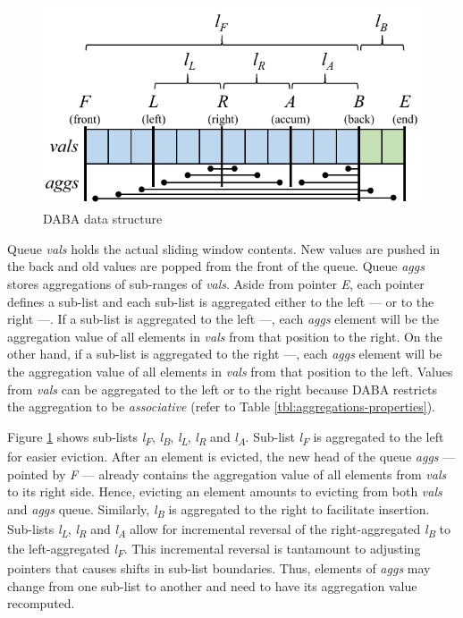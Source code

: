 \begin{figure}[!htb]
    \begin{center}
      \includegraphics[scale=0.6]{figures/daba-ds.png}
      \caption{DABA data structure}
      \label{fig:daba-ds}
    \end{center}
\end{figure}

Queue \textit{vals} holds the actual sliding window contents. New values are pushed in the back and old values are popped from the front of the queue. Queue \textit{aggs} stores aggregations of sub-ranges of \textit{vals}. Aside from pointer \textit{E}, each pointer defines a sub-list and each sub-list is aggregated either to the left \textbullet--- or to the right ---\textbullet. If a sub-list is aggregated to the left \textbullet---, each \textit{aggs} element will be the aggregation value of all elements in \textit{vals} from that position to the right. On the other hand, if a sub-list is aggregated to the right ---\textbullet, each \textit{aggs} element will be the aggregation value of all elements in \textit{vals} from that position to the left. Values from \textit{vals} can be aggregated to the left or to the right because DABA restricts the aggregation to be \textit{associative} (refer to Table \ref{tbl:aggregations-properties}).

Figure \ref{fig:daba-ds} shows sub-lists \textit{l\textsubscript{F}}, \textit{l\textsubscript{B}}, \textit{l\textsubscript{L}}, \textit{l\textsubscript{R}} and \textit{l\textsubscript{A}}. Sub-list \textit{l\textsubscript{F}} is aggregated to the left for easier eviction. After an element is evicted, the new head of the queue \textit{aggs} --- pointed by \textit{F} --- already contains the aggregation value of all elements from \textit{vals} to its right side. Hence, evicting an element amounts to evicting from both \textit{vals} and \textit{aggs} queue. Similarly, \textit{l\textsubscript{B}} is aggregated to the right to facilitate insertion. Sub-lists \textit{l\textsubscript{L}}, \textit{l\textsubscript{R}} and \textit{l\textsubscript{A}} allow for incremental reversal of the right-aggregated \textit{l\textsubscript{B}} to the left-aggregated \textit{l\textsubscript{F}}. This incremental reversal is tantamount to adjusting pointers that causes shifts in sub-list boundaries. Thus, elements of \textit{aggs} may change from one sub-list to another and need to have its aggregation value recomputed.


